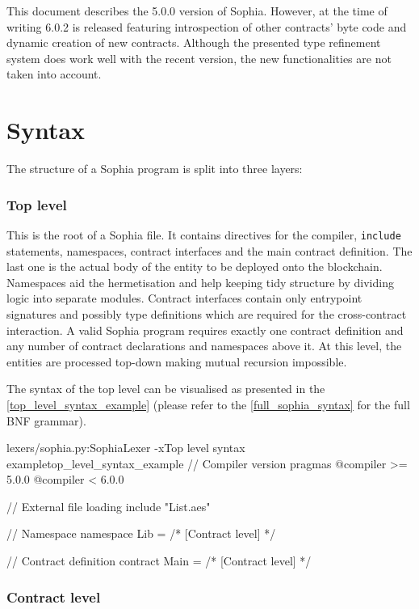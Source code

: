This document describes the 5.0.0 version of Sophia. However, at the time of
writing 6.0.2 is released featuring introspection of other contracts' byte code
and dynamic creation of new contracts. Although the presented type refinement
system does work well with the recent version, the new functionalities are not
taken into account.

\section{Syntax}

The structure of a Sophia program is split into three layers:

\subsubsection{Top level}

This is the root of a Sophia file. It contains directives for the compiler,
\texttt{include} statements, namespaces, contract interfaces and the main
contract definition. The last one is the actual body of the entity to be
deployed onto the blockchain. Namespaces aid the hermetisation and help keeping
tidy structure by dividing logic into separate modules. Contract interfaces
contain only entrypoint signatures and possibly type definitions which are
required for the cross-contract interaction. A valid Sophia program requires
exactly one contract definition and any number of contract declarations and
namespaces above it. At this level, the entities are processed top-down making
mutual recursion impossible.

The syntax of the top level can be visualised as presented in the
\autoref{top_level_syntax_example} (please refer to the
\autoref{full_sophia_syntax} for the full BNF grammar).

\begin{code}[H]{lexers/sophia.py:SophiaLexer -x}{Top level syntax example}{top_level_syntax_example}
// Compiler version pragmas
@compiler >= 5.0.0
@compiler < 6.0.0

// External file loading
include "List.aes"

// Namespace
namespace Lib =
  /* [Contract level] */

// Contract definition
contract Main =
  /* [Contract level] */
\end{code}


\subsubsection{Contract level}

